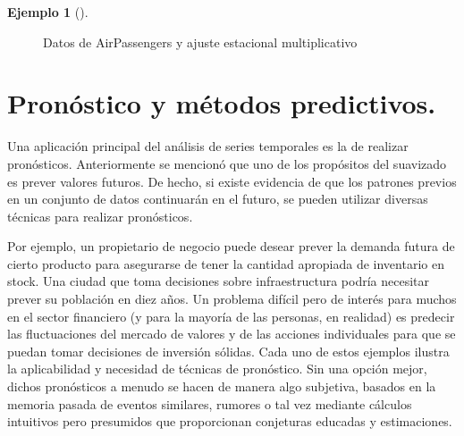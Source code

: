 \documentclass[
  us-letterpaper,
]{scrreprt}
\theoremstyle{definition}
\newtheorem{example}{Ejemplo}[chapter]
\theoremstyle{plain}
\theoremstyle{plain}
\theoremstyle{definition}
\theoremstyle{remark}
\begin{document}
\begin{example}[]
\begin{tcolorbox}
\begin{figure}[H]
\begin{minipage}{0.33\linewidth}


\end{minipage}%

\caption{\label{fig-AEmul}Datos de AirPassengers y ajuste estacional
multiplicativo}

\end{figure}%

\end{tcolorbox}

\end{example}

\section{Pronóstico y métodos
predictivos.}\label{pronuxf3stico-y-muxe9todos-predictivos.}

Una aplicación principal del análisis de series temporales es la de
realizar pronósticos. Anteriormente se mencionó que uno de los
propósitos del suavizado es prever valores futuros. De hecho, si existe
evidencia de que los patrones previos en un conjunto de datos
continuarán en el futuro, se pueden utilizar diversas técnicas para
realizar pronósticos.

Por ejemplo, un propietario de negocio puede desear prever la demanda
futura de cierto producto para asegurarse de tener la cantidad apropiada
de inventario en stock. Una ciudad que toma decisiones sobre
infraestructura podría necesitar prever su población en diez años. Un
problema difícil pero de interés para muchos en el sector financiero (y
para la mayoría de las personas, en realidad) es predecir las
fluctuaciones del mercado de valores y de las acciones individuales para
que se puedan tomar decisiones de inversión sólidas. Cada uno de estos
ejemplos ilustra la aplicabilidad y necesidad de técnicas de pronóstico.
Sin una opción mejor, dichos pronósticos a menudo se hacen de manera
algo subjetiva, basados en la memoria pasada de eventos similares,
rumores o tal vez mediante cálculos intuitivos pero presumidos que
proporcionan conjeturas educadas y estimaciones.
\end{document}
